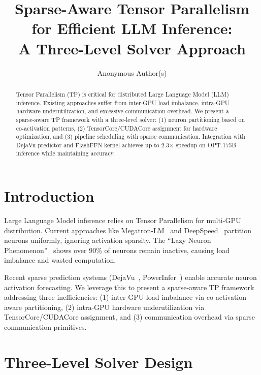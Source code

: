 \documentclass[runningheads]{llncs}
\begin{document}
\title{Sparse-Aware Tensor Parallelism for Efficient LLM Inference:\\
A Three-Level Solver Approach}

\author{Anonymous Author(s)}

\maketitle

\begin{abstract}
Tensor Parallelism (TP) is critical for distributed Large Language Model (LLM) inference. Existing approaches suffer from inter-GPU load imbalance, intra-GPU hardware underutilization, and excessive communication overhead. We present a sparse-aware TP framework with a three-level solver: (1) neuron partitioning based on co-activation patterns, (2) TensorCore/CUDACore assignment for hardware optimization, and (3) pipeline scheduling with sparse communication. Integration with DejaVu predictor and FlashFFN kernel achieves up to 2.3$\times$ speedup on OPT-175B inference while maintaining accuracy.

\end{abstract}

\section{Introduction}

Large Language Model inference relies on Tensor Parallelism for multi-GPU distribution. Current approaches like Megatron-LM~\cite{megatron} and DeepSpeed~\cite{deepspeed} partition neurons uniformly, ignoring activation sparsity. The ``Lazy Neuron Phenomenon''~\cite{lazyneuron} shows over 90\% of neurons remain inactive, causing load imbalance and wasted computation.

Recent sparse prediction systems (DejaVu~\cite{dejavu}, PowerInfer~\cite{powerinfer}) enable accurate neuron activation forecasting. We leverage this to present a sparse-aware TP framework addressing three inefficiencies: (1) inter-GPU load imbalance via co-activation-aware partitioning, (2) intra-GPU hardware underutilization via TensorCore/CUDACore assignment, and (3) communication overhead via sparse communication primitives.

\section{Three-Level Solver Design}
\end{document}
